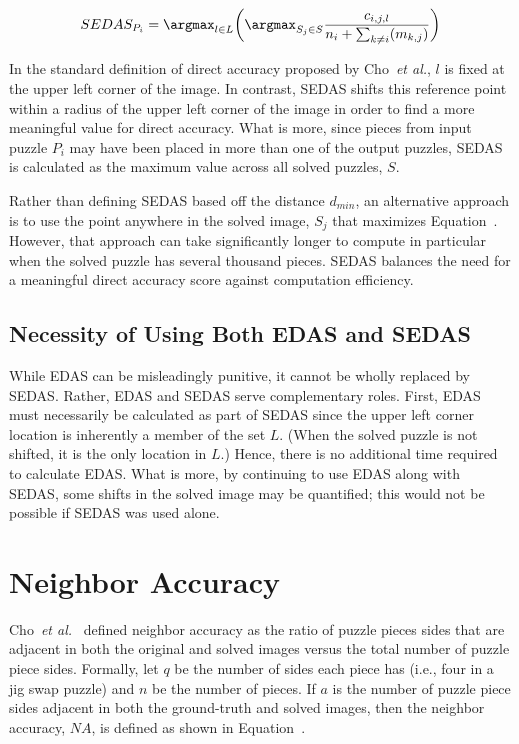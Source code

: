 \begin{equation} \label{eq:shiftableEnhancedDirectAccuracyScore}
SEDAS_{P_i} = \argmax_{l \in L} \bigg( \argmax_{S_j \in S}\frac{c_{i,j,l}}{n_i + \sum_{k \ne i}(m_{k,j})} \bigg)
\end{equation}


In the standard definition of direct accuracy proposed by Cho~\textit{et al.}, $l$ is fixed at the upper left corner of the image.  In contrast, SEDAS shifts this reference point within a radius of the upper left corner of the image in order to find a more meaningful value for direct accuracy. What is more, since pieces from input puzzle $P_i$ may have been placed in more than one of the output puzzles, SEDAS is calculated as the maximum value across all solved puzzles, $S$.

Rather than defining SEDAS based off the distance $d_{min}$, an alternative approach is to use the point anywhere in the solved image, $S_j$ that maximizes Equation~.  However, that approach can take significantly longer to compute in particular when the solved puzzle has several thousand pieces.  SEDAS balances the need for a meaningful direct accuracy score against computation efficiency.

\subsection{Necessity of Using Both EDAS and SEDAS}\label{sec:importanceEdasSedas}

While EDAS can be misleadingly punitive, it cannot be wholly replaced by SEDAS.  Rather, EDAS and SEDAS serve complementary roles.  First, EDAS must necessarily be calculated as part of SEDAS since the upper left corner location is inherently a member of the set $L$. (When the solved puzzle is not shifted, it is the only location in $L$.)  Hence, there is no additional time required to calculate EDAS.  What is more, by continuing to use EDAS along with SEDAS, some shifts in the solved image may be quantified; this would not be possible if SEDAS was used alone.

\section{Neighbor Accuracy}\label{sec:neighborAccuracy}

Cho~\textit{et al.}~\cite{cho2010} defined neighbor accuracy as the ratio of puzzle pieces sides that are adjacent in both the original and solved images versus the total number of puzzle piece sides.  Formally, let $q$ be the number of sides each piece has (i.e., four in a jig swap puzzle) and $n$ be the number of pieces.  If $a$ is the number of puzzle piece sides adjacent in both the ground-truth and solved images, then the neighbor accuracy, $NA$, is defined as shown in Equation~.

